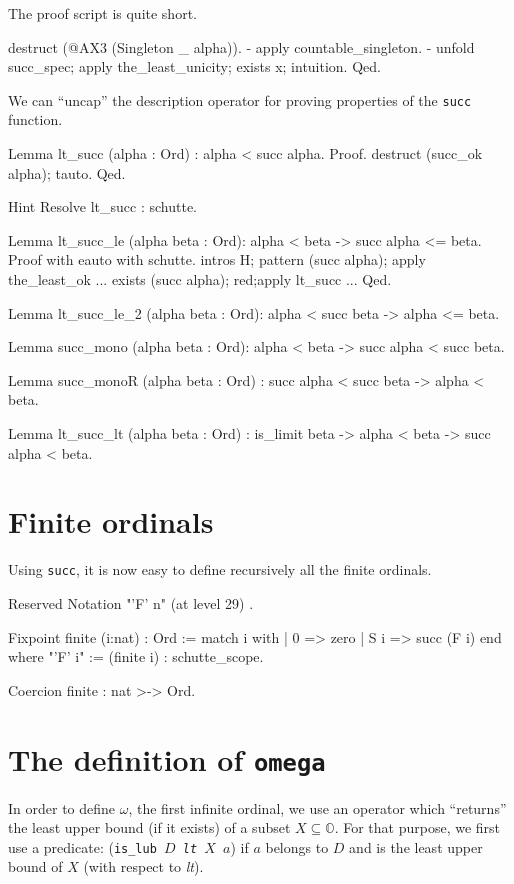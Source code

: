 {The \coq{} proof script is quite short.

\begin{Coqsrc}
  destruct (@AX3 (Singleton _ alpha)).
  - apply countable_singleton.
  -  unfold succ_spec; apply the_least_unicity;  exists x; intuition.
Qed.     
\end{Coqsrc}


We can ``uncap'' the description operator for proving properties of the
\texttt{succ} function.

\begin{Coqsrc}
Lemma lt_succ (alpha : Ord) :  alpha < succ alpha.
Proof.
  destruct  (succ_ok  alpha);  tauto.
Qed.

Hint Resolve lt_succ : schutte.

Lemma lt_succ_le (alpha beta : Ord):
  alpha < beta -> succ alpha <= beta.
Proof with eauto with schutte.
  intros  H;  pattern (succ alpha); apply the_least_ok ... 
  exists (succ alpha); red;apply lt_succ ...
Qed.
\end{Coqsrc}


\begin{Coqsrc}
Lemma lt_succ_le_2 (alpha beta : Ord):
  alpha < succ beta -> alpha <= beta.

Lemma succ_mono (alpha beta : Ord):
  alpha < beta -> succ alpha < succ beta.

Lemma succ_monoR (alpha beta : Ord) :
 succ alpha < succ beta -> alpha < beta.

Lemma lt_succ_lt (alpha beta : Ord) :
  is_limit beta ->  alpha < beta -> succ alpha < beta.
\end{Coqsrc}

\section{Finite ordinals}

Using \texttt{succ}, it is now easy to define recursively all the finite ordinals.

\label{sect:notation-F-sch}

\begin{Coqsrc}
Reserved Notation "'F' n" (at level 29) .

Fixpoint finite (i:nat) : Ord :=
  match i with 
            | 0 => zero
            | S i => succ (F i)
  end
where "'F' i" := (finite i)  : schutte_scope.

Coercion finite : nat >-> Ord.
\end{Coqsrc}

\section{The definition of \texttt{omega}}
In order to define $\omega$, the first infinite ordinal, we use an operator which
``returns'' the least upper bound (if it exists) of a subset $X\subseteq \mathbb{O}$.
For that purpose, we first use a predicate:
(\texttt{is\_lub $D$ \textit{lt} $X$ $a$}) if $a$ belongs to $D$ and is the least 
upper bound  of $X$ (with respect to \textit{lt}).


}
